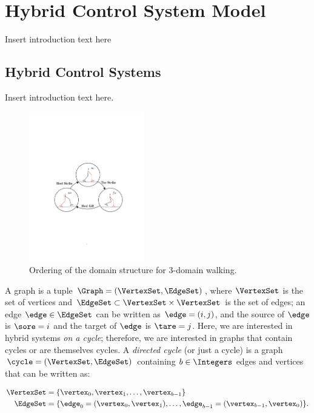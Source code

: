 \section{Hybrid Control System Model}
Insert introduction text here

\subsection{Hybrid Control Systems}
Insert introduction text here.
\begin{figure}[t!]
\centering
\includegraphics[width=0.45\textwidth]{figures/DomainGraph.pdf}
\caption{Ordering of the domain structure for 3-domain walking. }
\label{fig:DomainGraph}
\end{figure}

 A graph is a tuple $\Graph = (\VertexSet, \EdgeSet)$, where $\VertexSet$ is the set of vertices and $\EdgeSet \subset \VertexSet \times \VertexSet$ is the set of edges; an edge $\edge \in \EdgeSet$ can be written as $\edge = (i,j)$, and the source of $\edge$ is $\sore = i$ and the target of $\edge$ is $\tare=j$. Here, we are interested in hybrid systems \textit{on a cycle}; therefore, we are interested in graphs that contain cycles or are themselves cycles. A \textit{directed cycle} (or just a cycle) is a graph $\cycle = (\VertexSet, \EdgeSet)$ containing  $b \in \Integers$ edges and vertices that can be written as:

\begin{align}
 \VertexSet &= \{ \vertex_0,\vertex_1, \ldots ,\vertex_{b-1}\}\\
 \EdgeSet   &= \{ \edge_0 = (\vertex_0,\vertex_1), \ldots ,\edge_{b-1}=(\vertex_{b-1},\vertex_0)\}.\nonumber
\end{align}

